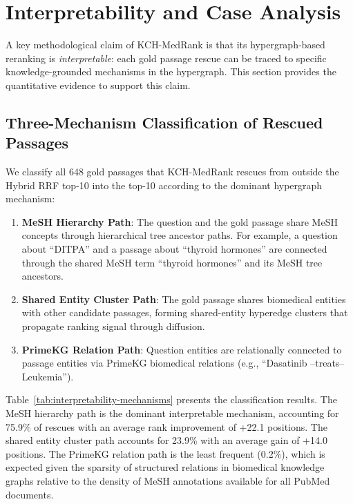 \section{Interpretability and Case Analysis}
\label{sec:interpretability}

A key methodological claim of KCH-MedRank is that its hypergraph-based reranking is \textit{interpretable}: each gold passage rescue can be traced to specific knowledge-grounded mechanisms in the hypergraph. This section provides the quantitative evidence to support this claim.

\subsection{Three-Mechanism Classification of Rescued Passages}

We classify all 648 gold passages that KCH-MedRank rescues from outside the Hybrid RRF top-10 into the top-10 according to the dominant hypergraph mechanism:

\begin{enumerate}[label=(\arabic*)]
    \item \textbf{MeSH Hierarchy Path}: The question and the gold passage share MeSH concepts through hierarchical tree ancestor paths. For example, a question about ``DITPA'' and a passage about ``thyroid hormones'' are connected through the shared MeSH term ``thyroid hormones'' and its MeSH tree ancestors.
    \item \textbf{Shared Entity Cluster Path}: The gold passage shares biomedical entities with other candidate passages, forming shared-entity hyperedge clusters that propagate ranking signal through diffusion.
    \item \textbf{PrimeKG Relation Path}: Question entities are relationally connected to passage entities via PrimeKG biomedical relations (e.g., ``Dasatinib --treats-- Leukemia'').
\end{enumerate}



Table~\ref{tab:interpretability-mechanisms} presents the classification results. The MeSH hierarchy path is the dominant interpretable mechanism, accounting for 75.9\% of rescues with an average rank improvement of +22.1 positions. The shared entity cluster path accounts for 23.9\% with an average gain of +14.0 positions. The PrimeKG relation path is the least frequent (0.2\%), which is expected given the sparsity of structured relations in biomedical knowledge graphs relative to the density of MeSH annotations available for all PubMed documents.

